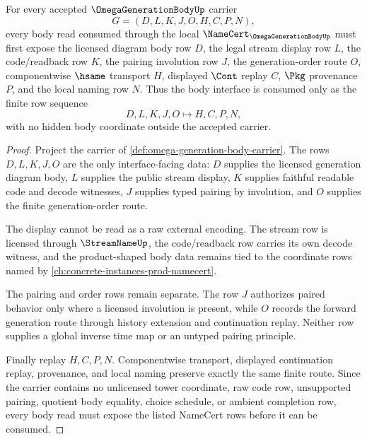 \begin{theorem}
\label{thm:omega-generation-body-display-namecert-obligations}
For every accepted $\OmegaGenerationBodyUp$ carrier
$$
G=(D,L,K,J,O,H,C,P,N),
$$
every body read consumed through the local $\NameCert_{\OmegaGenerationBodyUp}$ must first expose the licensed diagram body row $D$, the legal stream display row $L$, the code/readback row $K$, the pairing involution row $J$, the generation-order route $O$, componentwise $\hsame$ transport $H$, displayed $\Cont$ replay $C$, $\Pkg$ provenance $P$, and the local naming row $N$. Thus the body interface is consumed only as the finite row sequence
$$
D,L,K,J,O \longmapsto H,C,P,N,
$$
with no hidden body coordinate outside the accepted carrier.
\end{theorem}
\begin{proof}
Project the carrier of \autoref{def:omega-generation-body-carrier}. The rows $D,L,K,J,O$ are the only interface-facing data: $D$ supplies the licensed generation diagram body, $L$ supplies the public stream display, $K$ supplies faithful readable code and decode witnesses, $J$ supplies typed pairing by involution, and $O$ supplies the finite generation-order route.

The display cannot be read as a raw external encoding. The stream row is licensed through $\StreamNameUp$, the code/readback row carries its own decode witness, and the product-shaped body data remains tied to the coordinate rows named by \autoref{ch:concrete-instances-prod-namecert}.

The pairing and order rows remain separate. The row $J$ authorizes paired behavior only where a licensed involution is present, while $O$ records the forward generation route through history extension and continuation replay. Neither row supplies a global inverse time map or an untyped pairing principle.

Finally replay $H,C,P,N$. Componentwise transport, displayed continuation replay, provenance, and local naming preserve exactly the same finite route. Since the carrier contains no unlicensed tower coordinate, raw code row, unsupported pairing, quotient body equality, choice schedule, or ambient completion row, every body read must expose the listed NameCert rows before it can be consumed.
\end{proof}


